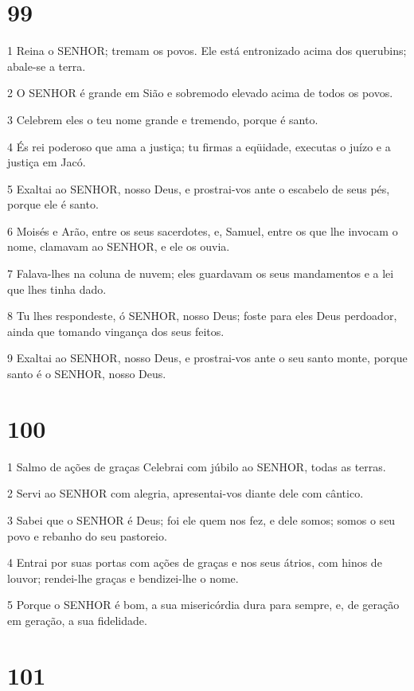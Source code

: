 \chapter{99}

\par 1 Reina o SENHOR; tremam os povos. Ele está entronizado acima dos querubins; abale-se a terra.
\par 2 O SENHOR é grande em Sião e sobremodo elevado acima de todos os povos.
\par 3 Celebrem eles o teu nome grande e tremendo, porque é santo.
\par 4 És rei poderoso que ama a justiça; tu firmas a eqüidade, executas o juízo e a justiça em Jacó.
\par 5 Exaltai ao SENHOR, nosso Deus, e prostrai-vos ante o escabelo de seus pés, porque ele é santo.
\par 6 Moisés e Arão, entre os seus sacerdotes, e, Samuel, entre os que lhe invocam o nome, clamavam ao SENHOR, e ele os ouvia.
\par 7 Falava-lhes na coluna de nuvem; eles guardavam os seus mandamentos e a lei que lhes tinha dado.
\par 8 Tu lhes respondeste, ó SENHOR, nosso Deus; foste para eles Deus perdoador, ainda que tomando vingança dos seus feitos.
\par 9 Exaltai ao SENHOR, nosso Deus, e prostrai-vos ante o seu santo monte, porque santo é o SENHOR, nosso Deus.

\chapter{100}

\par 1 Salmo de ações de graças Celebrai com júbilo ao SENHOR, todas as terras.
\par 2 Servi ao SENHOR com alegria, apresentai-vos diante dele com cântico.
\par 3 Sabei que o SENHOR é Deus; foi ele quem nos fez, e dele somos; somos o seu povo e rebanho do seu pastoreio.
\par 4 Entrai por suas portas com ações de graças e nos seus átrios, com hinos de louvor; rendei-lhe graças e bendizei-lhe o nome.
\par 5 Porque o SENHOR é bom, a sua misericórdia dura para sempre, e, de geração em geração, a sua fidelidade.

\chapter{101}

